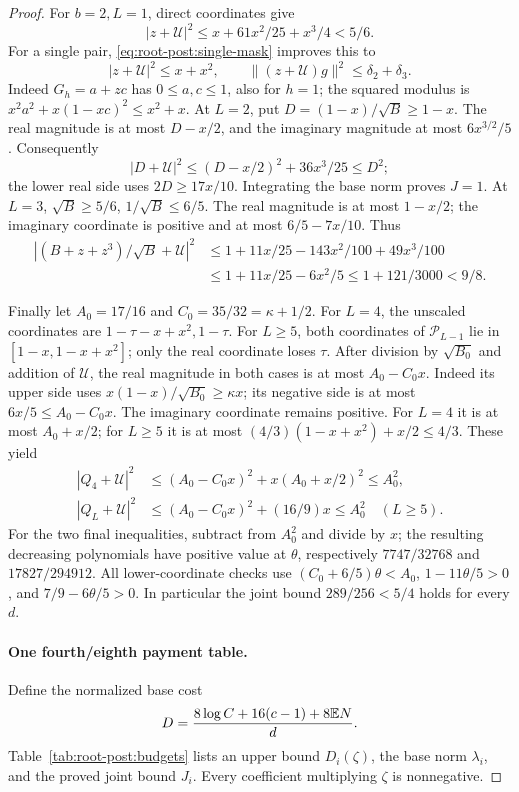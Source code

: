 \begin{proof}
For \(b=2,L=1\), direct coordinates give
\[
 |z+\mathcal U|^2\le x+61x^2/25+x^3/4<5/6.
\]
For a single pair, \eqref{eq:root-post:single-mask} improves this to
\begin{equation}\label{eq:root-post:tight-short-joint}
 |z+\mathcal U|^2\le x+x^2,\qquad
 \|(z+\mathcal U)g\|^2\le\delta_2+\delta_3 .
\end{equation}
Indeed \(G_h=a+zc\) has \(0\le a,c\le1\), also for \(h=1\);
the squared modulus is \(x^2a^2+x(1-xc)^2\le x^2+x\).
At \(L=2\), put \(D=(1-x)/\sqrt B\ge1-x\). The real magnitude is
at most \(D-x/2\), and the imaginary magnitude at most
\(6x^{3/2}/5\). Consequently
\[
 |D+\mathcal U|^2\le(D-x/2)^2+36x^3/25\le D^2;
\]
the lower real side uses \(2D\ge17x/10\). Integrating the base norm
proves \(J=1\).
At \(L=3\), \(\sqrt B\ge5/6\), \(1/\sqrt B\le6/5\).
The real magnitude is at most \(1-x/2\); the imaginary coordinate
is positive and at most \(6/5-7x/10\). Thus
\[
\begin{aligned}
 |(B+z+z^3)/\sqrt B+\mathcal U|^2
 &\le1+11x/25-143x^2/100+49x^3/100\\
 &\le1+11x/25-6x^2/5
 \le1+121/3000<9/8 .
\end{aligned}
\]

Finally let \(A_0=17/16\) and \(C_0=35/32=\kappa+1/2\).
For \(L=4\), the unscaled coordinates are
\(1-\tau-x+x^2,1-\tau\).
For \(L\ge5\), both coordinates of \(\mathcal P_{L-1}\) lie in
\([1-x,1-x+x^2]\); only the real coordinate loses \(\tau\).
After division by \(\sqrt {B_0}\) and addition of \(\mathcal U\),
the real magnitude in both cases is at most \(A_0-C_0x\).
Indeed its upper side uses \(x(1-x)/\sqrt {B_0}\ge\kappa x\);
its negative side is at most \(6x/5\le A_0-C_0x\).
The imaginary coordinate remains positive. For \(L=4\) it is at
most \(A_0+x/2\); for \(L\ge5\) it is at most
\((4/3)(1-x+x^2)+x/2\le4/3\).
These yield
\[
 \begin{aligned}
 |Q_4+\mathcal U|^2
 &\le(A_0-C_0x)^2+x(A_0+x/2)^2\le A_0^2,\\
 |Q_L+\mathcal U|^2
 &\le(A_0-C_0x)^2+(16/9)x\le A_0^2
 \quad(L\ge5).
 \end{aligned}
\]
For the two final inequalities, subtract from \(A_0^2\) and divide
by \(x\); the resulting decreasing polynomials have positive value
at \(\theta\), respectively \(7747/32768\) and \(17827/294912\).
All lower-coordinate checks use
\((C_0+6/5)\theta<A_0\),
\(1-11\theta/5>0\), and \(7/9-6\theta/5>0\).
In particular the joint bound \(289/256<5/4\) holds for every \(d\).

\paragraph{One fourth/eighth payment table.}\label{part:root-post:payments}
Define the normalized base cost
\[
 D=\frac{8\log C+16(c-1)+8\mathbb E N}{d}.
\]
Table~\ref{tab:root-post:budgets} lists an upper bound \(D_i(\zeta)\),
the base norm \(\lambda_i\), and the proved joint bound \(J_i\).
Every coefficient multiplying \(\zeta\) is nonnegative.


\end{proof}
